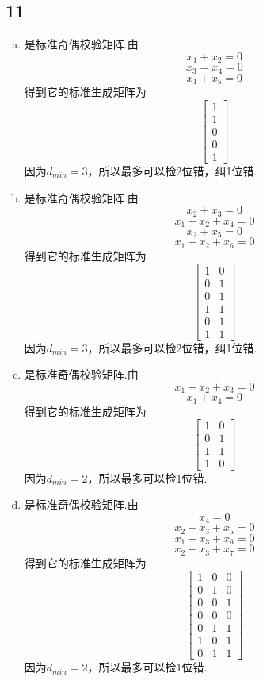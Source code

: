 \documentclass[twocolumn]{article}
\newenvironment{SChinese}{
	\CJKfamily{gbsn}
	\CJKtilde
	\CJKnospace}{}
\begin{document}
\begin{CJK}{UTF8}{}
\begin{SChinese}
			\subsection*{11}
				\begin{enumerate}[(a)]
					\item 是标准奇偶校验矩阵.由\[x_1+x_2=0\]\[x_3=x_4=0\]\[x_1+x_5=0\]得到它的标准生成矩阵为\begin{displaymath}
					\left [\begin{matrix} 1 \\ 1 \\ 0 \\ 0 \\ 1 \end{matrix}\right]
					\end{displaymath}
					因为$d_{min}=3$，所以最多可以检2位错，纠1位错.\\
					\item 是标准奇偶校验矩阵.由\[x_2+x_3=0\]\[x_1+x_2+x_4=0\]\[x_2+x_5=0\]\[x_1+x_2+x_6=0\]得到它的标准生成矩阵为\begin{displaymath}
					\left [\begin{matrix} 1 & 0 \\ 0 & 1 \\ 0 & 1 \\ 1 & 1 \\ 0 & 1 \\ 1 & 1 \end{matrix}\right]
					\end{displaymath}
					因为$d_{min}=3$，所以最多可以检2位错，纠1位错.\\
					\item 是标准奇偶校验矩阵.由\[x_1+x_2+x_3=0\]\[x_1+x_4=0\]得到它的标准生成矩阵为\begin{displaymath}
					\left [\begin{matrix} 1 & 0 \\ 0 & 1 \\ 1 & 1 \\ 1 & 0 \end{matrix}\right]
					\end{displaymath}
					因为$d_{min}=2$，所以最多可以检1位错.\\
					\item 是标准奇偶校验矩阵.由\[x_4=0\]\[x_2+x_3+x_5=0\]\[x_1+x_3+x_6=0\]
					\[x_2+x_3+x_7=0\]得到它的标准生成矩阵为\begin{displaymath}
					\left [\begin{matrix}
					 1 & 0 & 0\\
					 0 & 1 & 0\\
					 0 & 0 & 1\\ 
					 0 & 0 & 0\\
					 0 & 1 & 1\\
					 1 & 0 & 1\\
					 0 & 1 & 1 
					 \end{matrix}\right]
					\end{displaymath}
					因为$d_{min}=2$，所以最多可以检1位错.
				\end{enumerate}

\end{SChinese}
\end{CJK}
\end{document}
